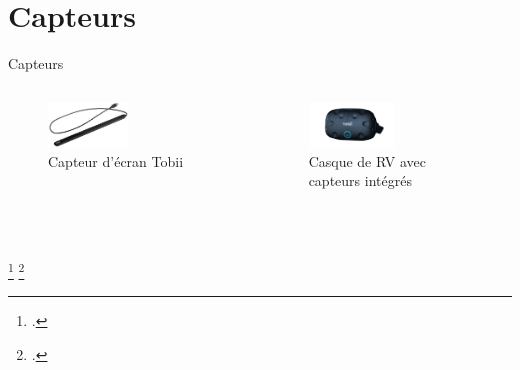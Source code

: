 \documentclass{beamer}
\begin{document}
\section{Capteurs}
\begin{frame}{Capteurs}
  \begin{columns}
    \begin{figure}
      \includegraphics[height=0.35\textwidth]{tobii.jpeg}
      \caption{Capteur d'écran Tobii \footnotemark}
    \end{figure}
    \begin{figure}
      \includegraphics[height=0.35\textwidth]{htcvive.png}
      \caption{Casque de RV avec capteurs intégrés \footnotemark}
    \end{figure}
  \end{columns}
  \addtocounter{footnote}{-1}
  \footcitetext{img_tobii}
  \footcitetext{img_htcvive}
\end{frame}
\end{document}
